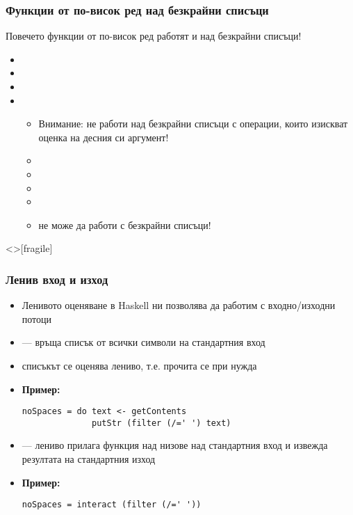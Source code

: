 \documentclass[alsotrans,beameroptions={aspectratio=169}]{beamerswitch}
\begin{document}
\begin{frame}
  \frametitle{Функции от по-висок ред над безкрайни списъци}

  Повечето функции от по-висок ред работят и над безкрайни списъци!
  \begin{itemize}[<+->]
  \item {}
  \item {}
  \item {}
  \item {}
    \begin{itemize}
    \item \alert{Внимание:}  не работи над безкрайни списъци с операции, които изискват оценка на десния си аргумент!
    \item {}
    \item {}
    \item {}
    \item {}
    \item \alert{ не може да работи с безкрайни списъци!}
    \end{itemize}
  \end{itemize}
\end{frame}

\begin{frame}<>[fragile]
  \frametitle{Ленив вход и изход}

  \begin{itemize}[<+->]
  \item Ленивото оценяване в Haskell ни позволява да работим с входно/изходни потоци
  \item {} --- връща списък от \alert{всички} символи на стандартния вход
  \item списъкът се оценява лениво, т.е. прочита се при нужда
  \item \textbf{Пример:}
\begin{lstlisting}
noSpaces = do text <- getContents
              putStr (filter (/=' ') text)
\end{lstlisting}
  \item {} --- лениво прилага функция над низове над стандартния вход и извежда резултата на стандартния изход
  \item \textbf{Пример:}
\begin{lstlisting}
noSpaces = interact (filter (/=' '))
\end{lstlisting}
  \end{itemize}
\end{frame}
\end{document}

